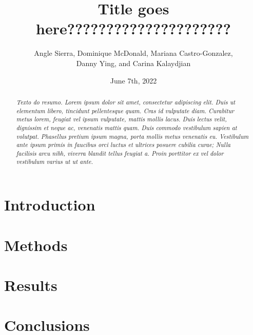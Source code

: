 \documentclass[11pt]{article}
\title {Title goes here?????????????????????\\[1ex]}
\author{
Angle Sierra, 
Dominique McDonald,
Mariana Castro-Gonzalez, \\
Danny Ying,
and Carina Kalaydjian \\[1ex]
}
\date{June 7th, 2022}
\newcommand{\abstractinenglishname}{Abstract}
\newenvironment{abstractinenglish}{
        \def\abstractname{\abstractinenglishname}
	\begin{abstract}
}{
        \end{abstract}
}
\begin{document}
\maketitle
\vspace{6pt}

\begin{abstractinenglish}
\emph{Texto do resumo. Lorem ipsum dolor sit amet, consectetur adipiscing elit. Duis ut elementum libero, tincidunt pellentesque quam. Cras id vulputate diam. Curabitur metus lorem, feugiat vel ipsum vulputate, mattis mollis lacus. Duis lectus velit, dignissim et neque ac, venenatis mattis quam. Duis commodo vestibulum sapien at volutpat. Phasellus pretium ipsum magna, porta mollis metus venenatis eu. Vestibulum ante ipsum primis in faucibus orci luctus et ultrices posuere cubilia curae; Nulla facilisis arcu nibh, viverra blandit tellus feugiat a. Proin porttitor ex vel dolor vestibulum varius ut ut ante.}
\end{abstractinenglish}


\section{Introduction}

\section{Methods}

\section{Results}

\section{Conclusions}



 
\end{document}
